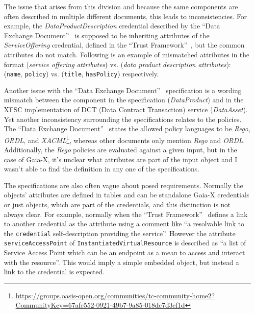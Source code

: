 The issue that arises from this division and because the same components are often described in multiple different documents, this leads to inconsistencies.
For example, the \textit{DataProductDescription} credential described by the ``Data Exchange Document''~\cite{gaiax_data_exchange_document} is supposed to be inheriting attributes of the \textit{ServiceOffering} credential, defined in the ``Trust Framework''~\cite{gaiax_trust_framework}, but the common attributes do not match.
Following is an example of mismatched attributes in the format (\textit{service offering attributes}) vs. (\textit{data product description attributes}): (\texttt{name}, \texttt{policy}) vs. (\texttt{title}, \texttt{hasPolicy}) respectively.

Another issue with the ``Data Exchange Document''~\cite{gaiax_data_exchange_document} specification is a wording mismatch between the component in the specification (\textit{DataProduct}) and in the XFSC implementation of DCT (Data Contract Transaction) service (\textit{DataAsset}).
Yet another inconsistency surrounding the specifications relates to the policies.
The ``Data Exchange Document''~\cite{gaiax_data_exchange_document} states the allowed policy languages to be \textit{Rego}, \textit{ORDL}, and \textit{XACML}\footnote{\url{https://groups.oasis-open.org/communities/tc-community-home2?CommunityKey=67afe552-0921-49b7-9a85-018dc7d3ef1d}}, whereas other documents only mention \textit{Rego} and \textit{ORDL}.
Additionally, the \textit{Rego} policies are evaluated against a given input, but in the case of Gaia-X, it's unclear what attributes are part of the input object and I wasn't able to find the definition in any one of the specifications.

The specifications are also often vague about posed requirements.
Normally the objects' attributes are defined in tables and can be standalone Gaia-X credentials or just objects, which are part of the credentials, and this distinction is not always clear.
For example, normally when the ``Trust Framework''~\cite{gaiax_trust_framework} defines a link to another credential as the attribute using a comment like ``a resolvable link to the \texttt{credential} self-description providing the service''.
However the attribute \texttt{serviceAccessPoint} of \texttt{InstantiatedVirtualResource} is described as ``a list of Service Access Point which can be an endpoint as a mean to access and interact with the resource''.
This would imply a simple embedded object, but instead a link to the credential is expected.

